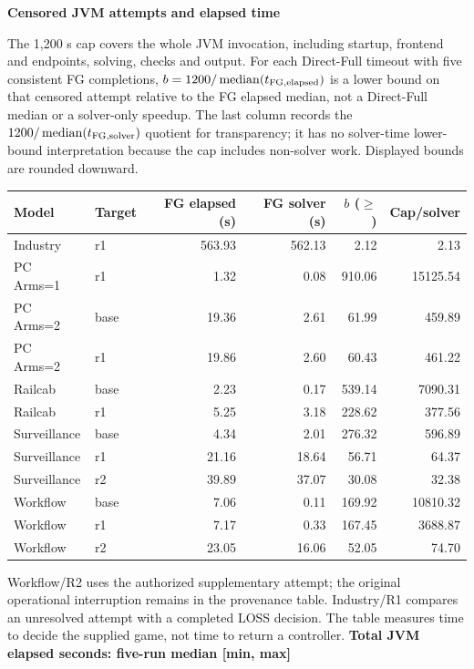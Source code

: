 \clearpage\noindent\textbf{Censored JVM attempts and elapsed time}\par
The 1,200 s cap covers the whole JVM invocation, including startup, frontend and endpoints, solving, checks and output. For each Direct-Full timeout with five consistent FG completions, $b=1200/\operatorname{median}(t_{\rm FG,elapsed})$ is a lower bound on that censored attempt relative to the FG elapsed median, not a Direct-Full median or a solver-only speedup. The last column records the $1200/\operatorname{median}(t_{\rm FG,solver})$ quotient for transparency; it has no solver-time lower-bound interpretation because the cap includes non-solver work. Displayed bounds are rounded downward.
\begin{longtable}{@{}llrrrr@{}}\toprule
Model & Target & FG elapsed (s) & FG solver (s) & $b$ ($\geq$) & Cap/solver\\\midrule\endhead
Industry & r1 & 563.93 & 562.13 & 2.12 & 2.13\\
PC Arms=1 & r1 & 1.32 & 0.08 & 910.06 & 15125.54\\
PC Arms=2 & base & 19.36 & 2.61 & 61.99 & 459.89\\
PC Arms=2 & r1 & 19.86 & 2.60 & 60.43 & 461.22\\
Railcab & base & 2.23 & 0.17 & 539.14 & 7090.31\\
Railcab & r1 & 5.25 & 3.18 & 228.62 & 377.56\\
Surveillance & base & 4.34 & 2.01 & 276.32 & 596.89\\
Surveillance & r1 & 21.16 & 18.64 & 56.71 & 64.37\\
Surveillance & r2 & 39.89 & 37.07 & 30.08 & 32.38\\
Workflow & base & 7.06 & 0.11 & 169.92 & 10810.32\\
Workflow & r1 & 7.17 & 0.33 & 167.45 & 3688.87\\
Workflow & r2 & 23.05 & 16.06 & 52.05 & 74.70\\
\bottomrule\end{longtable}
Workflow/R2 uses the authorized supplementary attempt; the original operational interruption remains in the provenance table. Industry/R1 compares an unresolved attempt with a completed LOSS decision. The table measures time to decide the supplied game, not time to return a controller.
\clearpage\noindent\textbf{Total JVM elapsed seconds: five-run median [min, max]}\par
\begingroup\scriptsize\setlength{\tabcolsep}{3pt}
